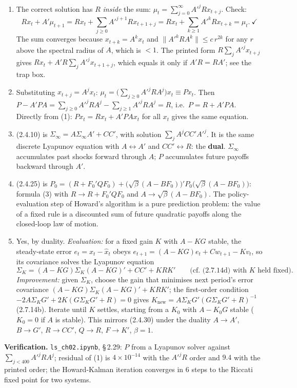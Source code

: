 \documentclass[12pt, letterpaper]{article}
\newcommand{\nb}[1]{\texttt{ls\_ch02.ipynb}, \S\,#1}
\begin{document}
\begin{tcolorbox}[oddbox,title={Exercise 2.29 \quad Pure Prediction}]
\begin{enumerate}
\item The correct solution has $R$ \emph{inside} the sum: $\mu_t=\sum_{j=0}^\infty A'^jRx_{t+j}$.
Check:
\[
Rx_t+A'\mu_{t+1}=Rx_t+\sum_{j\ge0}A'^{j+1}Rx_{t+1+j}=Rx_t+\sum_{k\ge1}A'^kRx_{t+k}=\mu_t.\ \checkmark
\]
The sum converges because $x_{t+k}=A^kx_t$ and $\|A'^kRA^k\|\le c\,r^{2k}$ for any $r$ above the
spectral radius of $A$, which is $<1$. The printed form $R\sum_jA'^jx_{t+j}$ gives
$Rx_t+A'R\sum_jA'^jx_{t+1+j}$, which equals it only if $A'R=RA'$; see the trap box.
\item[(a$'$)] Substituting $x_{t+j}=A^jx_t$: $\mu_t=\big(\sum_{j\ge0}A'^jRA^j\big)x_t\equiv Px_t$. Then
$P-A'PA=\sum_{j\ge0}A'^jRA^j-\sum_{j\ge1}A'^jRA^j=R$, i.e.\ $\boxed{P=R+A'PA}$. Directly from (1):
$Px_t=Rx_t+A'PAx_t$ for all $x_t$ gives the same equation.
\item[(c)] (2.4.10) is $\Sigma_\infty=A\Sigma_\infty A'+CC'$, with solution $\sum_jA^jCC'A'^j$. It is
the same discrete Lyapunov equation with $A\leftrightarrow A'$ and $CC'\leftrightarrow R$: the
\textbf{dual}. $\Sigma_\infty$ accumulates past shocks forward through $A$; $P$ accumulates future
payoffs backward through $A'$.
\item[(d)] (2.4.25) is $P_0=(R+F_0'QF_0)+\big(\sqrt\beta(A-BF_0)\big)'P_0\big(\sqrt\beta(A-BF_0)\big)$:
formula (3) with $R\to R+F_0'QF_0$ and $A\to\sqrt\beta(A-BF_0)$. The policy-evaluation step of Howard's
algorithm is a pure prediction problem: the value of a fixed rule is a discounted sum of future
quadratic payoffs along the closed-loop law of motion.
\item[(e)] Yes, by duality. \emph{Evaluation:} for a fixed gain $K$ with $A-KG$ stable, the steady-state
error $e_t=x_t-\hat x_t$ obeys $e_{t+1}=(A-KG)e_t+Cw_{t+1}-Kv_t$, so its covariance solves the Lyapunov
equation
\[
\Sigma_K=(A-KG)\Sigma_K(A-KG)'+CC'+KRK'\qquad\text{(cf. (2.7.14d) with $K$ held fixed).}
\]
\emph{Improvement:} given $\Sigma_K$, choose the gain that minimises next period's error covariance
$(A-KG)\Sigma_K(A-KG)'+KRK'$; the first-order condition $-2A\Sigma_KG'+2K(G\Sigma_KG'+R)=0$ gives
$K_{\text{new}}=A\Sigma_KG'(G\Sigma_KG'+R)^{-1}$ (2.7.14b). Iterate until $K$ settles, starting from a
$K_0$ with $A-K_0G$ stable ($K_0=0$ if $A$ is stable). This mirrors (2.4.30) under the duality
$A\to A'$, $B\to G'$, $R\to CC'$, $Q\to R$, $F\to K'$, $\beta=1$.
\end{enumerate}

\textbf{Verification.} \nb{2.29}: $P$ from a Lyapunov solver against $\sum_{j<400}A'^jRA^j$; residual of
(1) is $4\times10^{-14}$ with the $A'^jR$ order and $9.4$ with the printed order; the Howard-Kalman
iteration converges in 6 steps to the Riccati fixed point for two systems. \checkmark
\end{tcolorbox}
\end{document}
